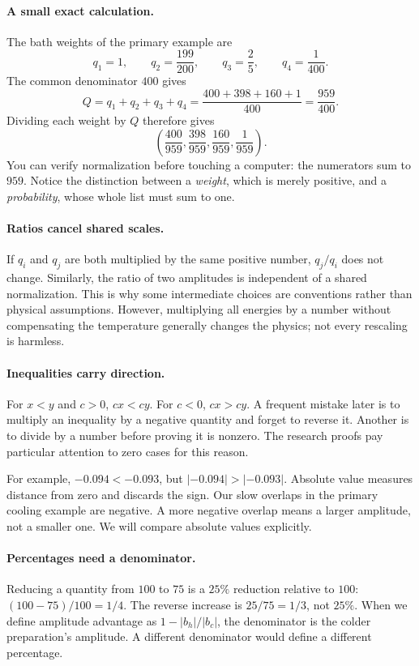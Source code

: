 \documentclass[11pt]{article}
\begin{document}
\paragraph{A small exact calculation.}
The bath weights of the primary example are
\[
q_1=1,\qquad q_2=\frac{199}{200},\qquad
q_3=\frac25,\qquad q_4=\frac1{400}.
\]
The common denominator $400$ gives
\[
Q=q_1+q_2+q_3+q_4
=\frac{400+398+160+1}{400}=\frac{959}{400}.
\]
Dividing each weight by $Q$ therefore gives
\[
\left(\frac{400}{959},\frac{398}{959},
\frac{160}{959},\frac1{959}\right).
\]
You can verify normalization before touching a computer: the numerators sum to
$959$. Notice the distinction between a \emph{weight}, which is merely positive,
and a \emph{probability}, whose whole list must sum to one.

\paragraph{Ratios cancel shared scales.}
If $q_i$ and $q_j$ are both multiplied by the same positive number, $q_j/q_i$
does not change. Similarly, the ratio of two amplitudes is independent of a
shared normalization. This is why some intermediate choices are conventions
rather than physical assumptions. However, multiplying all energies by a
number without compensating the temperature generally changes the physics;
not every rescaling is harmless.

\paragraph{Inequalities carry direction.}
For $x<y$ and $c>0$, $cx<cy$. For $c<0$, $cx>cy$. A frequent mistake later is
to multiply an inequality by a negative quantity and forget to reverse it.
Another is to divide by a number before proving it is nonzero. The research
proofs pay particular attention to zero cases for this reason.

For example, $-0.094<-0.093$, but $|-0.094|>|-0.093|$. Absolute value measures
distance from zero and discards the sign. Our slow overlaps in the primary
cooling example are negative. A more negative overlap means a larger amplitude,
not a smaller one. We will compare absolute values explicitly.

\paragraph{Percentages need a denominator.}
Reducing a quantity from $100$ to $75$ is a $25\%$ reduction relative to $100$:
$(100-75)/100=1/4$. The reverse increase is $25/75=1/3$, not $25\%$. When we
define amplitude advantage as $1-|b_h|/|b_c|$, the denominator is the colder
preparation's amplitude. A different denominator would define a different
percentage.
\end{document}
